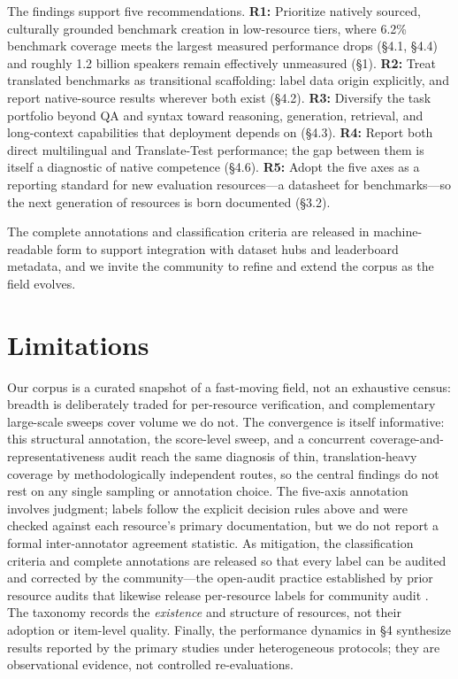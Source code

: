 \documentclass[letterpaper]{article} %
\begin{document}
The findings support five recommendations. \textbf{R1:} Prioritize natively sourced, culturally grounded benchmark creation in low-resource tiers, where 6.2\% benchmark coverage meets the largest measured performance drops (\S4.1, \S4.4) and roughly 1.2 billion speakers remain effectively unmeasured (\S1). \textbf{R2:} Treat translated benchmarks as transitional scaffolding: label data origin explicitly, and report native-source results wherever both exist (\S4.2). \textbf{R3:} Diversify the task portfolio beyond QA and syntax toward reasoning, generation, retrieval, and long-context capabilities that deployment depends on (\S4.3). \textbf{R4:} Report both direct multilingual and Translate-Test performance; the gap between them is itself a diagnostic of native competence (\S4.6). \textbf{R5:} Adopt the five axes as a reporting standard for new evaluation resources---a datasheet for benchmarks---so the next generation of resources is born documented (\S3.2).
 
The complete annotations and classification criteria are released in machine-readable form to support integration with dataset hubs and leaderboard metadata, and we invite the community to refine and extend the corpus as the field evolves.
 
\section{Limitations}
Our corpus is a curated snapshot of a fast-moving field, not an exhaustive census: breadth is deliberately traded for per-resource verification, and complementary large-scale sweeps \cite{wu2025bitter} cover volume we do not. The convergence is itself informative: this structural annotation, the score-level sweep, and a concurrent coverage-and-representativeness audit \cite{uppadhyay2026state} reach the same diagnosis of thin, translation-heavy coverage by methodologically independent routes, so the central findings do not rest on any single sampling or annotation choice. The five-axis annotation involves judgment; labels follow the explicit decision rules above and were checked against each resource's primary documentation, but we do not report a formal inter-annotator agreement statistic. As mitigation, the classification criteria and complete annotations are released so that every label can be audited and corrected by the community---the open-audit practice established by prior resource audits that likewise release per-resource labels for community audit \cite{kreutzer-etal-2022-quality,lovenia2024seacrowd}. The taxonomy records the \emph{existence} and structure of resources, not their adoption or item-level quality. Finally, the performance dynamics in \S4 synthesize results reported by the primary studies under heterogeneous protocols; they are observational evidence, not controlled re-evaluations.
 
\end{document}
